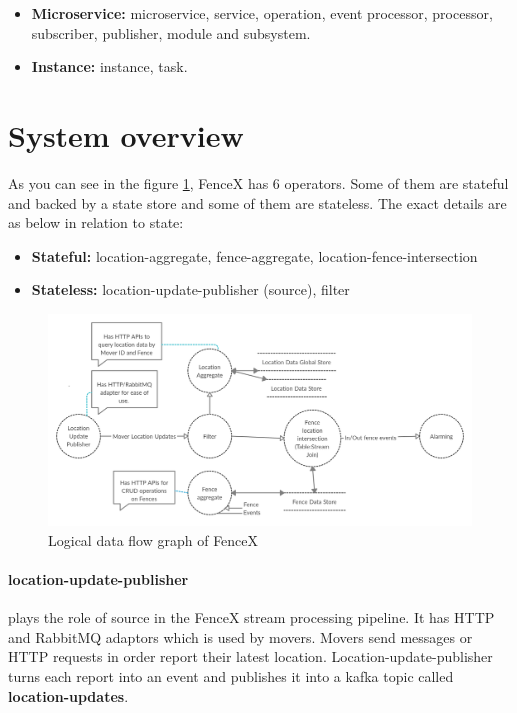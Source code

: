 \documentclass[a4]{report}
\begin{document}
    \begin{itemize}
        \item \textbf{Microservice:} microservice, service, operation, event processor, processor, subscriber,
        publisher, module and subsystem.
        \item \textbf{Instance:} instance, task.
    \end{itemize}


    \section{System overview}
    As you can see in the figure \ref{fig:logical-dfg}, FenceX has 6 operators.
    Some of them are stateful and backed by a state store and some of them are stateless.
    The exact details are as below in relation to state:

    \begin{itemize}
        \item \textbf{Stateful:} location-aggregate, fence-aggregate, location-fence-intersection
        \item \textbf{Stateless:} location-update-publisher (source), filter
    \end{itemize}

    \begin{figure}[ht]
        \centering
        \caption{Logical data flow graph of FenceX}
        \label{fig:logical-dfg}
        \includegraphics[width=\linewidth ,scale=0.2]{images/logical-data-flow-diagram.png}
    \end{figure}

    \paragraph{location-update-publisher} plays the role of source in the FenceX stream processing pipeline.
    It has HTTP and RabbitMQ\cite{rabbitMq} adaptors which is used by movers.
    Movers send messages or HTTP requests in order report their latest location.
    Location-update-publisher turns each report into an event and publishes it into a kafka topic called
    \textbf{location-updates}.
\end{document}
